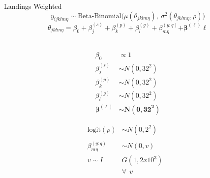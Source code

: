 \documentclass[ xcolor = pdftex, dvipsnames, table ]{beamer}
\begin{document}
%
\begin{frame}{Landings Weighted}
\vspace*{-0.5cm}
\begin{equation*}
        y_{ijklm\eta} \sim \text{Beta-Binomial}\Big(\mu( \theta_{jklm\eta}),~\sigma^2( \theta_{jklm\eta}, \rho) \Big)
\end{equation*}
\begin{equation*}
        \theta_{jklm\eta} = \beta_0 + \beta^{(s)}_j + \beta^{(p)}_k + \beta^{(g)}_l + \beta^{(y:q)}_{m\eta} \bm{+ \beta^{(\ell)}\ell} 
\end{equation*}
$~$\\
\vspace*{-0.25cm}
\hspace*{-0.5cm}
\begin{minipage}[h!]{0.3\textwidth}
	\begin{align*}
	\beta_0 &\propto 1\\
	\beta^{(s)}_j &\sim N(0, 32^2)\\
	\beta^{(p)}_k &\sim N(0, 32^2)\\
	\beta^{(g)}_l &\sim N(0, 32^2)\\
	\bm{\beta^{(\ell)}} &\bm{\sim N(0, 32^2)}
	\end{align*}
\end{minipage}
\begin{minipage}[h!]{0.39\textwidth}
	\begin{align*}
        \text{logit}(\rho) &\sim N(0, 2^2)\\
	&&\\
	\beta^{(y:q)}_{m\eta} &\sim N(0,v)\\
        v\sim I&G(1,2x10^{3})\\
	&\forall ~~ v 
        \end{align*}

\end{minipage}
\end{frame}
\end{document}
